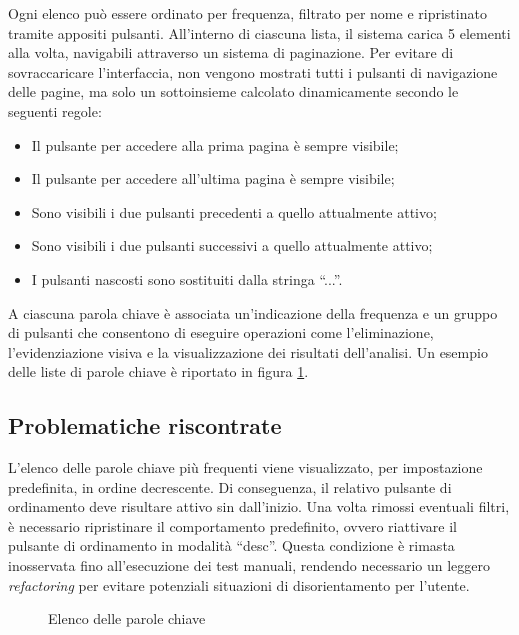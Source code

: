 \vspace{5pt}
\par\noindent Ogni elenco può essere ordinato per frequenza, filtrato per nome e ripristinato tramite appositi pulsanti. All’interno di ciascuna lista, il sistema carica 5 elementi alla volta, navigabili attraverso un sistema di paginazione. Per evitare di sovraccaricare l’interfaccia, non vengono mostrati tutti i pulsanti di navigazione delle pagine, ma solo un sottoinsieme calcolato dinamicamente secondo le seguenti regole:
\begin{itemize}
  \item Il pulsante per accedere alla prima pagina è sempre visibile;
  \item Il pulsante per accedere all’ultima pagina è sempre visibile;
  \item Sono visibili i due pulsanti precedenti a quello attualmente attivo;
  \item Sono visibili i due pulsanti successivi a quello attualmente attivo;
  \item I pulsanti nascosti sono sostituiti dalla stringa “...”.
\end{itemize}

\vspace{5pt}
\par\noindent A ciascuna parola chiave è associata un’indicazione della frequenza e un gruppo di pulsanti che consentono di eseguire operazioni come l’eliminazione, l’evidenziazione visiva e la visualizzazione dei risultati dell’analisi. Un esempio delle liste di parole chiave è riportato in figura \ref{fig:keyword_list}.

\subsection{Problematiche riscontrate}

\par L’elenco delle parole chiave più frequenti viene visualizzato, per impostazione predefinita, in ordine decrescente. Di conseguenza, il relativo pulsante di ordinamento deve risultare attivo sin dall’inizio. Una volta rimossi eventuali filtri, è necessario ripristinare il comportamento predefinito, ovvero riattivare il pulsante di ordinamento in modalità “desc”. Questa condizione è rimasta inosservata fino all’esecuzione dei test manuali, rendendo necessario un leggero \textit{refactoring} per evitare potenziali situazioni di disorientamento per l’utente.

\begin{figure}[H]
  \centering 
  \caption{Elenco delle parole chiave}
  \label{fig:keyword_list}
\end{figure}
